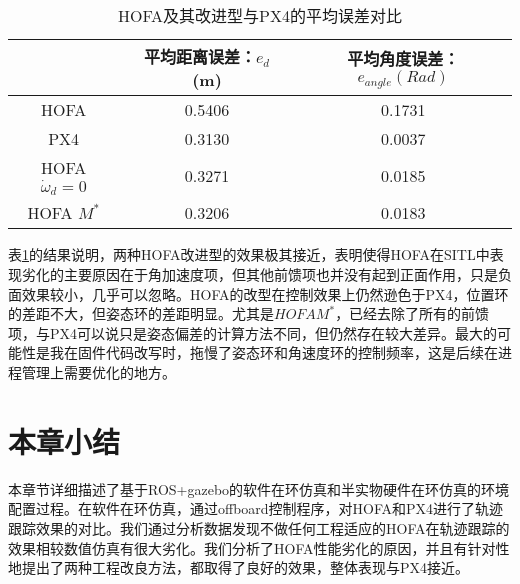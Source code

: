 \begin{table}[H]
  \centering
  \caption{HOFA及其改进型与PX4的平均误差对比}
  \label{HOFA改}
  \begin{tabular}{ccc}
      \toprule
      & 平均距离误差：$e_d$ (m)& 平均角度误差：$e_{angle}(Rad)$  \\
      \midrule
      HOFA &0.5406  & 0.1731\\
      PX4 & 0.3130 &  0.0037\\
      HOFA $\dot \omega_d=0$ & 0.3271 & 0.0185\\
      HOFA $M^*$ &0.3206  & 0.0183\\
      \bottomrule
  \end{tabular}
\end{table}
表\ref{HOFA改}的结果说明，两种HOFA改进型的效果极其接近，表明使得HOFA在SITL中表现劣化的主要原因在于角加速度项，但其他前馈项也并没有起到正面作用，只是负面效果较小，几乎可以忽略。HOFA的改型在控制效果上仍然逊色于PX4，位置环的差距不大，但姿态环的差距明显。尤其是$HOFA M^*$，已经去除了所有的前馈项，与PX4可以说只是姿态偏差的计算方法不同，但仍然存在较大差异。最大的可能性是我在固件代码改写时，拖慢了姿态环和角速度环的控制频率，这是后续在进程管理上需要优化的地方。
\newpage

\section{本章小结}
本章节详细描述了基于ROS+gazebo的软件在环仿真和半实物硬件在环仿真的环境配置过程。在软件在环仿真，通过offboard控制程序，对HOFA和PX4进行了轨迹跟踪效果的对比。我们通过分析数据发现不做任何工程适应的HOFA在轨迹跟踪的效果相较数值仿真有很大劣化。我们分析了HOFA性能劣化的原因，并且有针对性地提出了两种工程改良方法，都取得了良好的效果，整体表现与PX4接近。